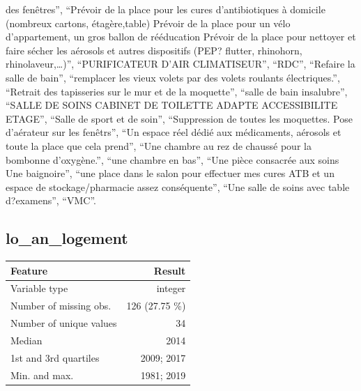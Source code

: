 \documentclass[
  letterpaper,
  DIV=11,
  numbers=noendperiod]{scrartcl}
\begin{document}
\begin{itemize}
  des fenêtres'', ``Prévoir de la place pour les cures d'antibiotiques à
  domicile (nombreux cartons, étagère,table) Prévoir de la place pour un
  vélo d'appartement, un gros ballon de rééducation Prévoir de la place
  pour nettoyer et faire sécher les aérosols et autres dispositifs (PEP?
  flutter, rhinohorn, rhinolaveur,\ldots)'', ``PURIFICATEUR D'AIR
  CLIMATISEUR'', ``RDC'', ``Refaire la salle de bain'', ``remplacer les
  vieux volets par des volets roulants électriques.'', ``Retrait des
  tapisseries sur le mur et de la moquette'', ``salle de bain
  insalubre'', ``SALLE DE SOINS CABINET DE TOILETTE ADAPTE ACCESSIBILITE
  ETAGE'', ``Salle de sport et de soin'', ``Suppression de toutes les
  moquettes. Pose d'aérateur sur les fenêtrs'', ``Un espace réel dédié
  aux médicaments, aérosols et toute la place que cela prend'', ``Une
  chambre au rez de chaussé pour la bombonne d'oxygène.'', ``une chambre
  en bas'', ``Une pièce consacrée aux soins Une baignoire'', ``une place
  dans le salon pour effectuer mes cures ATB et un espace de
  stockage/pharmacie assez conséquente'', ``Une salle de soins avec
  table d?examens'', ``VMC''.
\end{itemize}

\fullline

\subsection{lo\_an\_logement}\label{lo_an_logement}

\bminione

\begin{longtable}[]{@{}lr@{}}
\toprule\noalign{}
Feature & Result \\
\midrule\noalign{}
\endhead
\bottomrule\noalign{}
\endlastfoot
Variable type & integer \\
Number of missing obs. & 126 (27.75 \%) \\
Number of unique values & 34 \\
Median & 2014 \\
1st and 3rd quartiles & 2009; 2017 \\
Min. and max. & 1981; 2019 \\
\end{longtable}

\emini
\bminitwo
\end{document}
